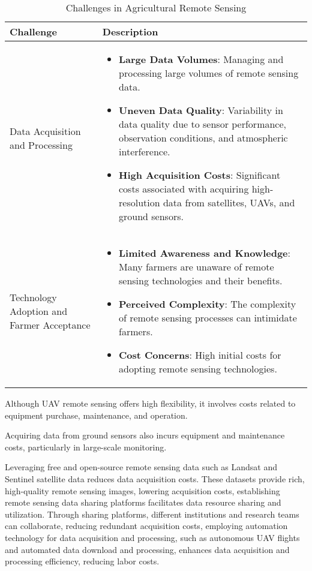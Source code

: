 \begin{table*}[h!]
    \centering
    \caption{Challenges in Agricultural Remote Sensing}
    \begin{tabular}{m{6cm}m{9cm}}
    \toprule
    \textbf{Challenge} & \textbf{Description} \\
    \midrule
    Data Acquisition and Processing & 
    \begin{itemize}
        \item \textbf{Large Data Volumes}: Managing and processing large volumes of remote sensing data.
        \item \textbf{Uneven Data Quality}: Variability in data quality due to sensor performance, observation conditions, and atmospheric interference.
        \item \textbf{High Acquisition Costs}: Significant costs associated with acquiring high-resolution data from satellites, UAVs, and ground sensors.
    \end{itemize} \\
    \midrule
    Technology Adoption and Farmer Acceptance & 
    \begin{itemize}
        \item \textbf{Limited Awareness and Knowledge}: Many farmers are unaware of remote sensing technologies and their benefits.
        \item \textbf{Perceived Complexity}: The complexity of remote sensing processes can intimidate farmers.
        \item \textbf{Cost Concerns}: High initial costs for adopting remote sensing technologies.
    \end{itemize} \\
    \bottomrule
    \end{tabular}
    \label{table:challenges}
\end{table*}

Although UAV remote sensing offers high flexibility, it involves costs related to equipment purchase, maintenance, and operation.

Acquiring data from ground sensors also incurs equipment and maintenance costs, particularly in large-scale monitoring.

Leveraging free and open-source remote sensing data such as Landsat and Sentinel satellite data reduces data acquisition costs. These datasets provide rich, high-quality remote sensing images, lowering acquisition costs, establishing remote sensing data sharing platforms facilitates data resource sharing and utilization. Through sharing platforms, different institutions and research teams can collaborate, reducing redundant acquisition costs, employing automation technology for data acquisition and processing, such as autonomous UAV flights and automated data download and processing, enhances data acquisition and processing efficiency, reducing labor costs.

